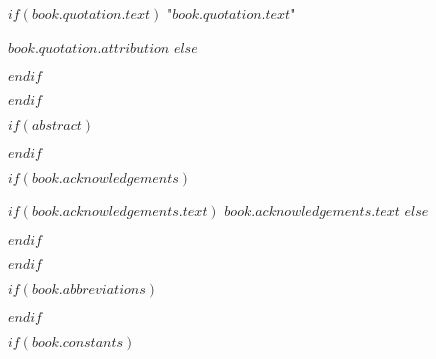 \vspace*{0.2\textheight}

$if(book.quotation.text)$
\noindent"{\itshape $book.quotation.text$}"\bigbreak

\hfill $book.quotation.attribution$
$else$

$endif$

$endif$

$if(abstract)$

\begin{abstract}
\addchaptertocentry{\abstractname} %
$abstract$
\end{abstract}

$endif$

$if(book.acknowledgements)$

\begin{acknowledgements}
\addchaptertocentry{\acknowledgementname} %
$if(book.acknowledgements.text)$
$book.acknowledgements.text$
$else$

$endif$
\end{acknowledgements}

$endif$


\tableofcontents %

\listoffigures %

\listoftables %

$if(book.abbreviations)$



$endif$

$if(book.constants)$

